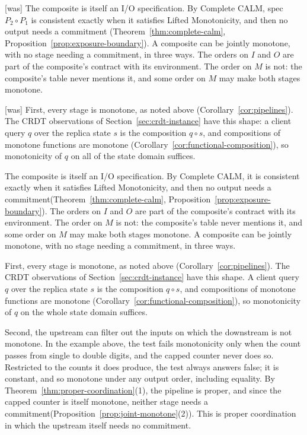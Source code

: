 \documentclass[sigconf]{cidr-2027}
\theoremstyle{remark}
\newcommand{\commitment}{commitment\xspace}
\newcommand{\spectype}[1][]{I/O specification#1\xspace}
\begin{document}
{\footnotesize\color{black!50}\noindent\textsf{[was]} The composite is itself an \spectype.  By Complete CALM, spec $P_2\circ P_1$ is consistent exactly when it
satisfies Lifted Monotonicity, and then no output needs a \commitment
(Theorem~\ref{thm:complete-calm}, Proposition~\ref{prop:exposure-boundary}).
A composite can be jointly monotone, with no stage needing a
\commitment, in three ways.  The orders on $I$ and $O$ are part of the composite's contract
with its environment.  The order on $M$ is not: the composite's table never
mentions it, and some order on $M$ may make both stages monotone.\par}



{\footnotesize\color{black!50}\noindent\textsf{[was]} First, every stage is monotone, as noted above
(Corollary~\ref{cor:pipelines}).  The CRDT observations of Section~\ref{sec:crdt-instance} have this shape: a
client query $q$ over the replica state $s$ is the composition $q\circ s$, and
compositions of monotone functions are monotone
(Corollary~\ref{cor:functional-composition}), so
monotonicity of $q$ on all of the state domain suffices.\par}

\color{blue!70!black}The composite is itself an \spectype.  By Complete CALM, it is consistent
exactly when it satisfies Lifted Monotonicity, and then no output needs a
\commitment (Theorem~\ref{thm:complete-calm},
Proposition~\ref{prop:exposure-boundary}).  The orders on $I$ and $O$ are part
of the composite's contract with its environment.  The order on $M$ is not:
the composite's table never mentions it, and some order on $M$ may make both
stages monotone.  A composite can be jointly monotone, with no stage needing a
\commitment, in three ways.\color{black}

\color{blue!70!black}First, every stage is monotone, as noted above
(Corollary~\ref{cor:pipelines}).  The CRDT observations of Section~\ref{sec:crdt-instance} have this shape.  A
client query $q$ over the replica state $s$ is the composition $q\circ s$, and
compositions of monotone functions are monotone
(Corollary~\ref{cor:functional-composition}), so monotonicity of $q$ on the
whole state domain suffices.\color{black}

Second, the upstream can filter out the inputs on which the downstream is not
monotone.  In the example above, the test fails monotonicity only when the
count passes from single to double digits, and the capped counter never does
so.  Restricted to the counts it does produce, the test always answers
\textsf{false}; it is constant, and so monotone under any output order,
including equality.  By Theorem~\ref{thm:proper-coordination}(1), the pipeline
is proper, and since the capped counter is itself monotone, neither stage needs
a \commitment (Proposition~\ref{prop:joint-monotone}(2)).  This is proper
coordination in which the upstream itself needs no \commitment.
\end{document}
